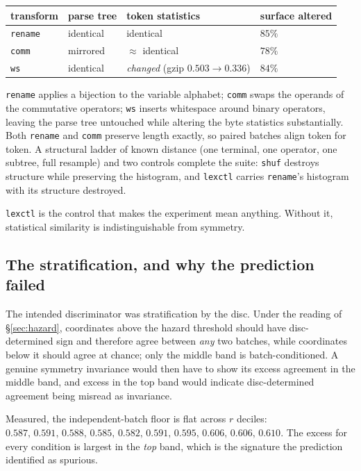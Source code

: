 \begin{center}
\begin{tabular}{llll}
\hline
transform & parse tree & token statistics & surface altered \\
\hline
\texttt{rename} & identical & identical      & $85\%$ \\
\texttt{comm}   & mirrored  & $\approx$ identical & $78\%$ \\
\texttt{ws}     & identical & \emph{changed} (gzip $0.503\to0.336$) & $84\%$ \\
\hline
\end{tabular}
\end{center}

\texttt{rename} applies a bijection to the variable alphabet; \texttt{comm}
swaps the operands of the commutative operators; \texttt{ws} inserts
whitespace around binary operators, leaving the parse tree untouched while
altering the byte statistics substantially. Both \texttt{rename} and
\texttt{comm} preserve length exactly, so paired batches align token for
token. A structural ladder of known distance (one terminal, one operator, one
subtree, full resample) and two controls complete the suite: \texttt{shuf}
destroys structure while preserving the histogram, and \texttt{lexctl} carries
\texttt{rename}'s histogram with its structure destroyed.

\texttt{lexctl} is the control that makes the experiment mean anything. Without
it, statistical similarity is indistinguishable from symmetry.

\subsection{The stratification, and why the prediction failed}
\label{sec:rstrat}

The intended discriminator was stratification by the disc. Under the reading of
\S\ref{sec:hazard}, coordinates above the hazard threshold should have
disc-determined sign and therefore agree between \emph{any} two batches, while
coordinates below it should agree at chance; only the middle band is
batch-conditioned. A genuine symmetry invariance would then have to show its
excess agreement in the middle band, and excess in the top band would indicate
disc-determined agreement being misread as invariance.

Measured, the independent-batch floor is flat across $r$ deciles:
$0.587,\,0.591,\,0.588,\,0.585,\,0.582,\,0.591,\,0.595,\,0.606,\,0.606,\,0.610$.
The excess for every condition is largest in the \emph{top} band, which is the
signature the prediction identified as spurious.

